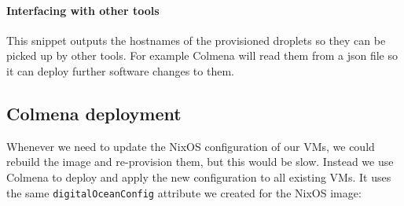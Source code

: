 \documentclass[
]{article}
\newenvironment{Shaded}{}{}
\newcommand{\NormalTok}[1]{#1}
\begin{document}
\hypertarget{interfacing-with-other-tools}{%
  \paragraph{Interfacing with other
    tools}\label{interfacing-with-other-tools}}

This snippet outputs the hostnames of the provisioned droplets so they
can be picked up by other tools. For example Colmena will read them from
a json file so it can deploy further software changes to them.

\begin{Shaded}
\end{Shaded}

\hypertarget{colmena-deployment}{%
  \subsection{Colmena deployment}\label{colmena-deployment}}

Whenever we need to update the NixOS configuration of our VMs, we could
rebuild the image and re-provision them, but this would be slow. Instead
we use Colmena to deploy and apply the new configuration to all existing
VMs. It uses the same \texttt{digitalOceanConfig} attribute we created
for the NixOS image:
\end{document}
